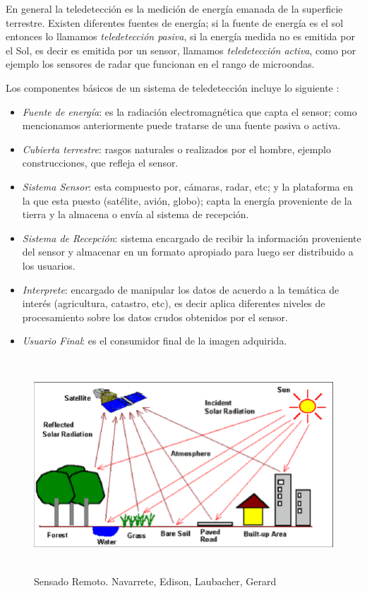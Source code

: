 En general la teledetección es la medición de energía emanada de la superficie terrestre. Existen diferentes fuentes de energía; si la fuente de energía es el sol entonces lo llamamos \textit{teledetección pasiva}, si la energía medida no es emitida por el Sol, es decir es emitida por un sensor, llamamos \textit{teledetección activa}, como por ejemplo los sensores de radar que funcionan en el rango de microondas.

Los componentes básicos de un sistema de teledetección incluye lo siguiente \citep{chuvieco}:
\begin{itemize}
\item \textit{Fuente de energía}: es la radiación electromagnética que capta el sensor; como mencionamos anteriormente puede tratarse de una fuente pasiva o activa.

\item \textit{Cubierta terrestre}: rasgos naturales o realizados por el hombre, ejemplo construcciones, que refleja el sensor.

\item \textit{Sistema Sensor}: esta compuesto por, cámaras, radar, etc; y la plataforma en la que esta puesto (satélite, avión, globo);  capta la energía proveniente de la tierra y la almacena o envía al sistema de recepción.

\item \textit{Sistema de Recepción}: sistema encargado de recibir la información proveniente del sensor y almacenar en un formato apropiado para luego ser distribuido a los usuarios.

\item \textit{Interprete}: encargado de manipular los datos de acuerdo a la temática de interés (agricultura, catastro, etc), es decir aplica diferentes niveles de procesamiento sobre los datos crudos obtenidos por el sensor.

\item \textit{Usuario Final}: es el consumidor final de la imagen adquirida.
\end{itemize}

\begin{figure}[H] \centering
  \includegraphics[height=8cm,keepaspectratio=true,clip=true]{imagenes/MarcoTeorico/teledeteccion.png}
  \caption{Sensado Remoto. Navarrete, Edison, Laubacher, Gerard}\label{Fig:teledeteccion}
\end{figure}

